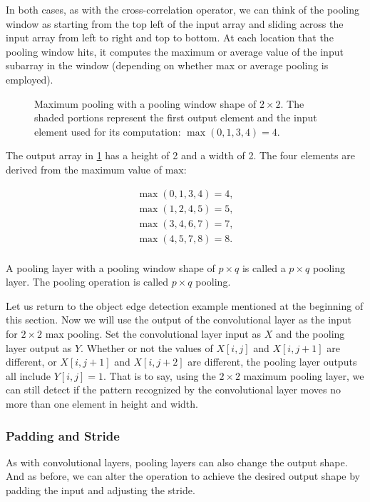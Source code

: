 In both cases, as with the cross-correlation operator, we can think of the pooling window as starting from the top left of the input array and sliding across the input array from left to right and top to bottom. At each location that the pooling window hits, it computes the maximum or average value of the input subarray in the window (depending on whether max or average pooling is employed).

\begin{figure}[hpt]
    \centering
    
    \caption{Maximum pooling with a pooling window shape of $2\times2$. The shaded portions represent the first output element and the input element used for its computation:  $\max(0,1,3,4)=4$.}
    \label{fig:pooling}
\end{figure}

The output array in \cref{fig:pooling} has a height of 2 and a width of 2. The four elements are derived from the maximum value of $\text{max}$:

\begin{align*}
\max(0,1,3,4)=4,\\
\max(1,2,4,5)=5,\\
\max(3,4,6,7)=7,\\
\max(4,5,7,8)=8.\\
\end{align*}

A pooling layer with a pooling window shape of $p \times q$ is called a $p \times q$ pooling layer. The pooling operation is called $p \times q$ pooling.

Let us return to the object edge detection example mentioned at the beginning of this section. Now we will use the output of the convolutional layer as the input for $2 \times 2$  max pooling. Set the convolutional layer input as $X$ and the pooling layer output as $Y$. Whether or not the values of $X[i, j]$ and $X[i, j+1]$ are different, or $X[i, j+1]$ and $X[i, j+2]$ are different, the pooling layer outputs all include $Y[i, j]=1$. That is to say, using the $2 \times 2$ maximum pooling layer, we can still detect if the pattern recognized by the convolutional layer moves no more than one element in height and width.

\subsubsection{Padding and Stride}

As with convolutional layers, pooling layers can also change the output shape. And as before, we can alter the operation to achieve the desired output shape by padding the input and adjusting the stride.

